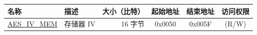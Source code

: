 \begin{longtable}{ |p{3cm} | p{3cm} | r | c | c | c |  }
\hline
\rowcolor{lightgray}
名称 & 描述  &  大小（比特）  &  起始地址  &  结束地址  & 访问权限   \\ \hline
{\hyperref[memdesc:AESIVMEM]{AES\_IV\_MEM}} & 存储器 IV & 16 字节  & 0x0050 & 0x005F & (R/W) \\ \hline

\end{longtable}
